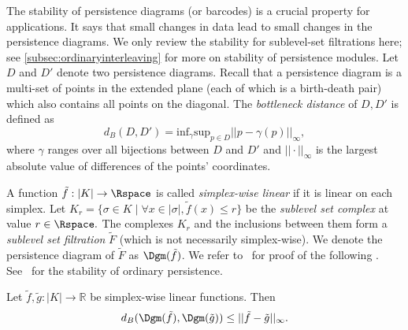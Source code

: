 The stability of persistence diagrams (or barcodes) is a crucial property for applications. It says that small changes in data lead to small changes in the persistence diagrams. 
We only review the stability for sublevel-set filtrations here; see \cref{subsec:ordinaryinterleaving} for more on stability of persistence modules.
Let $D$ and $D'$ denote two persistence diagrams. Recall that a persistence diagram is a multi-set of points in the extended plane (each of which is a birth-death pair) which also contains all points on the diagonal.
The \emph{bottleneck distance} of $D,D'$ is defined as 
\[
d_B(D, D') = \text{inf}_\gamma \text{sup}_{p \in D} || p - \gamma(p) ||_\infty,
\]
where $\gamma$ ranges over all bijections between $D$ and $D'$ and $||\cdot ||_\infty$ is the largest absolute value of differences of the points' coordinates.
  
A function $\tilde{f} : |K| \rightarrow \Rspace$ is called \emph{simplex-wise linear} if it is linear on each simplex.
Let $K_r = \{ \sigma \in K\mid\forall x \in |\sigma|, \tilde{f}(x) \leq r \}$ be the \textit{sublevel set complex} at value $r\in \Rspace.$ The complexes $K_r$ and the inclusions between them form a \textit{sublevel set filtration} $\tilde{F}$ (which is not necessarily simplex-wise). We denote the persistence diagram of $\tilde{F}$ as $\Dgm(\tilde{f})$.
We refer to~\cite{Cohen-SteinerEdelsbrunnerHarer2005, ChazalCohenSteinerGlisse2009} for proof of the following . See~\cite{Cohen-SteinerEdelsbrunnerHarer2005, ChazalCohenSteinerGlisse2009} for the stability of ordinary persistence.

\begin{theorem}
    Let $\tilde{f}, \tilde{g}: |K| \xrightarrow{} \mathbb{R}$ be simplex-wise linear functions. Then $$ d_B( \Dgm(\tilde{f}), \Dgm(\tilde{g})) \leq ||\tilde{f} - \tilde{g} ||_\infty.$$
\end{theorem}


 





